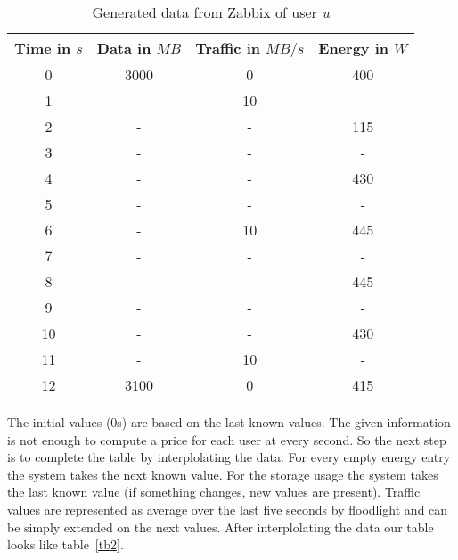 \begin{table}
\centering
\caption{Generated data from Zabbix of user \textit{u}}
\begin{tabular}{|c|c|c|c|}
 \hline Time in $s$ & Data in $MB$ & Traffic in $MB/s$ & Energy in $W$ \\ 
  \hline 0 & 3000 & 0 & 400 \\ 
 \hline 1 & - & 10 & - \\ 
 \hline 2 & - & - & 115 \\ 
 \hline 3 & - & - & -\\ 
 \hline 4 & - & - & 430 \\ 
 \hline 5 & - & - & - \\
 \hline 6 & - & 10 & 445 \\ 
 \hline 7 & - & - & -\\ 
 \hline 8 & - & - & 445 \\ 
 \hline 9 & - & - & - \\  
 \hline 10 & - & - & 430 \\
  \hline 11 & - & 10 & - \\
 \hline 12 & 3100 & 0 & 415 \\  
 \hline 
 \end{tabular}
 \label{tb1} 
 \end{table}
 
 The initial values (0s) are based on the last known values. The given information is not enough to compute a price for each user at every second. So the next step is to complete the table by interplolating the data. For every empty energy entry the system takes the next known value. For the storage usage the system takes the last known value (if something changes, new values are present). Traffic values are represented as average over the last five seconds by floodlight and can be simply extended on the next values. After interplolating the data our table looks like table~\ref{tb2}.
 
